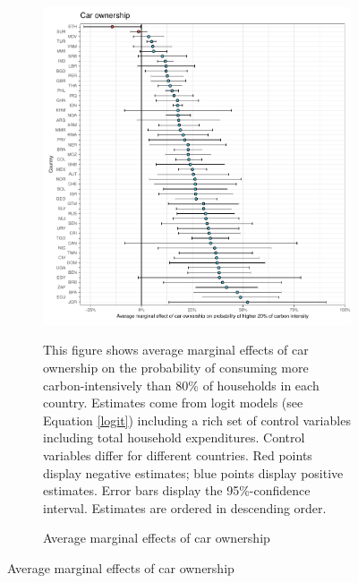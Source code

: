  \begin{figure}[ht!]\ContinuedFloat
   \centering
   \begin{subfigure}[b]{\textwidth}
   \centering
   \includegraphics{1_Figures/Analysis_Logit_Models_Marginal_Effects/Average_Marginal_Effects_affected_upper_80_car.01_2017B.pdf}
   \caption{Average marginal effects of car ownership} \label{fig:Logit_ME_car}
   \begin{subcaption2}
     This figure shows average marginal effects of car ownership on the probability of consuming more carbon-intensively than 80\% of households in each country. Estimates come from logit models (see Equation \ref{logit}) including a rich set of control variables including total household expenditures. Control variables differ for different countries. Red points display negative estimates; blue points display positive estimates. Error bars display the 95\%-confidence interval. Estimates are ordered in descending order.
   \end{subcaption2}
   \end{subfigure}
 \end{figure}
 \clearpage

